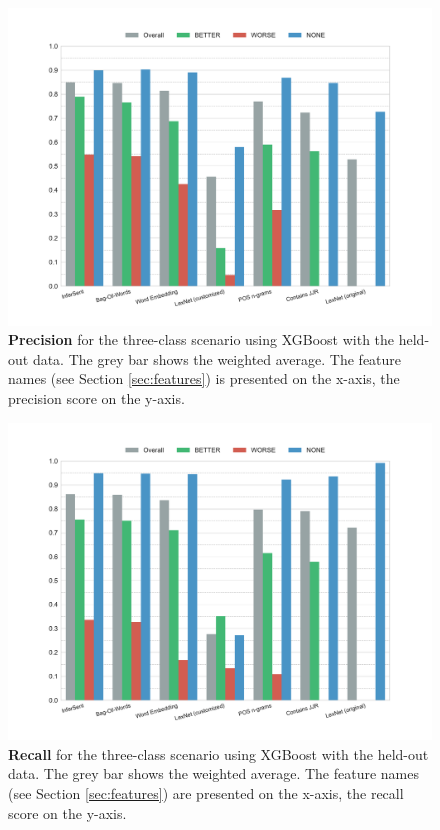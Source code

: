 \begin{figure}[htbp]
         \caption{\textbf{Precision} for the three-class scenario using XGBoost with the held-out data. The grey bar shows the weighted average. The feature names (see Section \ref{sec:features}) is presented on the x-axis, the precision score on the y-axis.} 
    \label{fig:h_3_prec}
    \centering
	\includegraphics[width=0.9\linewidth]{images/heldout/h-precision-False}
    \end{figure}
    
    \begin{figure}[htbp]
              \caption{\textbf{Recall} for the three-class scenario using XGBoost with the held-out data. The grey bar shows the weighted average. The feature names (see Section \ref{sec:features}) are presented on the x-axis, the recall score on the y-axis.} 
       \label{fig:h_3_rec}
 \centering
	\includegraphics[width=0.9\linewidth]{images/heldout/h-recall-False}

\end{figure}

